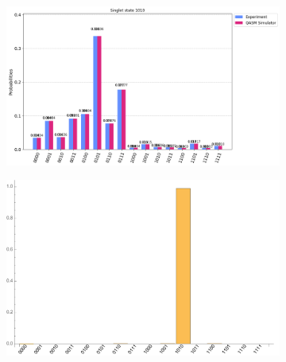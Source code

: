 \documentclass[10pt]{amsart}
\theoremstyle{definition}
\begin{document}
\begin{figure}[hbt]
    \begin{subfigure}{0.4\textwidth}
    \centering
    \includegraphics[width=0.9\linewidth]{smallt_inputSing2_quantum.png}
  \end{subfigure}
  \begin{subfigure}{0.4\textwidth}
    \centering
    \includegraphics[width=0.9\linewidth]{smallt_inputSing2_exact.pdf}
  \end{subfigure}
  

\end{figure}
\end{document}
